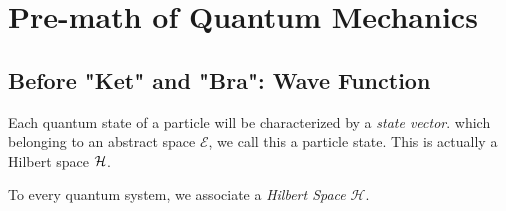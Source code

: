 \chapter{Pre-math of Quantum Mechanics}

\section{ Before "Ket" and "Bra": Wave Function}

Each quantum state of a particle will be characterized by a \textit{state vector}. which belonging to an abstract space $\mathcal{E}$, we call this a particle state. This is actually a Hilbert space $\mathcal{H}$. 

\begin{lemma}
    To every quantum system, we associate a \textit{Hilbert Space} $\mathcal{H}$.
\end{lemma}

